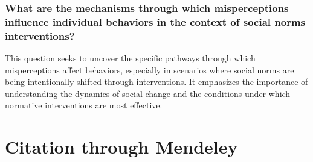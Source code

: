 \documentclass{article}
\begin{document}
\subsubsection{What are the mechanisms through which misperceptions influence individual behaviors in the context of social norms interventions?}
{This question seeks to uncover the specific pathways through which misperceptions affect behaviors, especially in scenarios where social norms are being intentionally shifted through interventions. It emphasizes the importance of understanding the dynamics of social change and the conditions under which normative interventions are most effective.}


\section{\textbf{Citation through Mendeley}}

\subsection{}
\end{document}
